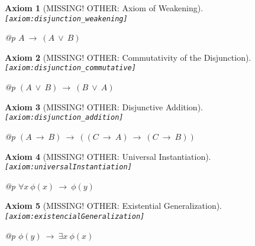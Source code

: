 \documentclass[a4paper,german,10pt,twoside]{book}
\newtheorem{ax}{Axiom}
\theoremstyle{definition}
\theoremstyle{remark}
\begin{document}
\begin{ax}[MISSING! OTHER: Axiom of Weakening]
\label{axiom:disjunction_weakening} \hypertarget{axiom:disjunction_weakening}{}
{\tt \tiny [\verb]axiom:disjunction_weakening]]}
\mbox{}
\begin{longtable}{{@{\extracolsep{\fill}}p{\linewidth}}}
\centering $A\ \rightarrow\ (A\ \lor\ B)$
\end{longtable}

\end{ax}


\begin{ax}[MISSING! OTHER: Commutativity of the Disjunction]
\label{axiom:disjunction_commutative} \hypertarget{axiom:disjunction_commutative}{}
{\tt \tiny [\verb]axiom:disjunction_commutative]]}
\mbox{}
\begin{longtable}{{@{\extracolsep{\fill}}p{\linewidth}}}
\centering $(A\ \lor\ B)\ \rightarrow\ (B\ \lor\ A)$
\end{longtable}

\end{ax}


\begin{ax}[MISSING! OTHER: Disjunctive Addition]
\label{axiom:disjunction_addition} \hypertarget{axiom:disjunction_addition}{}
{\tt \tiny [\verb]axiom:disjunction_addition]]}
\mbox{}
\begin{longtable}{{@{\extracolsep{\fill}}p{\linewidth}}}
\centering $(A\ \rightarrow\ B)\ \rightarrow\ ((C\ \rightarrow\ A)\ \rightarrow\ (C\ \rightarrow\ B))$
\end{longtable}

\end{ax}


\begin{ax}[MISSING! OTHER: Universal Instantiation]
\label{axiom:universalInstantiation} \hypertarget{axiom:universalInstantiation}{}
{\tt \tiny [\verb]axiom:universalInstantiation]]}
\mbox{}
\begin{longtable}{{@{\extracolsep{\fill}}p{\linewidth}}}
\centering $\forall x\ \phi(x)\ \rightarrow\ \phi(y)$
\end{longtable}

\end{ax}


\begin{ax}[MISSING! OTHER: Existential Generalization]
\label{axiom:existencialGeneralization} \hypertarget{axiom:existencialGeneralization}{}
{\tt \tiny [\verb]axiom:existencialGeneralization]]}
\mbox{}
\begin{longtable}{{@{\extracolsep{\fill}}p{\linewidth}}}
\centering $\phi(y)\ \rightarrow\ \exists x\ \phi(x)$
\end{longtable}

\end{ax}
\end{document}
